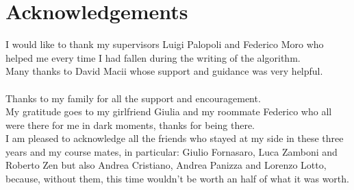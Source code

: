 \chapter*{Acknowledgements}
\thispagestyle{empty}

I would like to thank my supervisors Luigi Palopoli and Federico Moro who helped me every time I had fallen during the writing of the algorithm.
\\
Many thanks to David Macii whose support and guidance was very helpful.
\\ \\
Thanks to my family for all the support and encouragement.
\\
My gratitude goes to my girlfriend Giulia and my roommate Federico who all were there for me in dark moments, thanks for being there.
\\ 
I am pleased to acknowledge all the friends who stayed at my side in these three years and my course mates, in particular:
Giulio Fornasaro, Luca Zamboni and Roberto Zen but also Andrea Cristiano, Andrea Panizza and Lorenzo Lotto, because, without them, this time wouldn't be worth an half of what it was worth.

